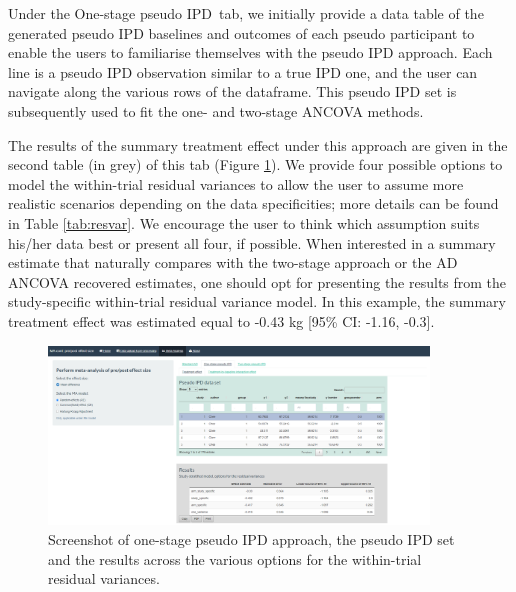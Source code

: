 \documentclass[AMA,STIX1COL]{WileyNJD-v2}
\begin{document}
Under the \textquotesingle One-stage pseudo IPD\textquotesingle\ tab, we initially provide a data table of the generated pseudo IPD baselines and outcomes of each pseudo participant to enable the users to familiarise themselves with the pseudo IPD approach. Each line is a pseudo IPD observation similar to a true IPD one, and the user can navigate along the various rows of the dataframe. This pseudo IPD set is subsequently used to fit the one- and two-stage ANCOVA methods. 

The results of the summary treatment effect under this approach are given in the second table (in grey) of this tab (Figure \ref{fig:shiny-one-stage}). We provide four possible options to model the within-trial residual variances to allow the user to assume more realistic scenarios depending on the data specificities; more details can be found in Table \ref{tab:resvar}. We encourage the user to think which assumption suits his/her data best or present all four, if possible. When interested in a summary estimate that naturally compares with the two-stage approach or the AD ANCOVA recovered estimates, one should opt for presenting the results from the study-specific within-trial residual variance model. In this example, the summary treatment effect was estimated equal to -0.43 kg [95\% CI: -1.16, -0.3].


\begin{figure}[t]
  \centering \includegraphics[width=0.9\textwidth]{One stage_shiny.jpeg}
    \caption{\small {Screenshot of one-stage pseudo IPD approach, the pseudo IPD set and the results across the various options for the within-trial residual variances.}} \label{fig:shiny-one-stage}
\end{figure}
\end{document}
